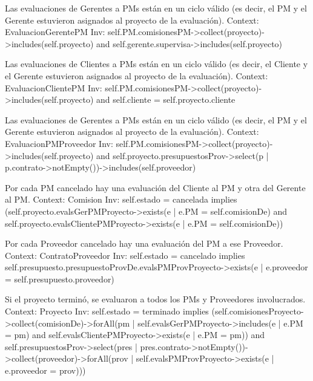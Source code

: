 \begin{listocl}

\begin{itemocl}{Las evaluaciones de Gerentes a PMs están en un ciclo válido (es decir, el PM y el Gerente estuvieron asignados al proyecto de la evaluación).}
Context: EvaluacionGerentePM
Inv: self.PM.comisionesPM->collect(proyecto)->includes(self.proyecto) and self.gerente.supervisa->includes(self.proyecto)
\end{itemocl}

\begin{itemocl}{Las evaluaciones de Clientes a PMs están en un ciclo válido (es decir, el Cliente y el Gerente estuvieron asignados al proyecto de la evaluación).}
Context: EvaluacionClientePM
Inv: self.PM.comisionesPM->collect(proyecto)->includes(self.proyecto) and self.cliente = self.proyecto.cliente
\end{itemocl}

\begin{itemocl}{Las evaluaciones de Gerentes a PMs están en un ciclo válido (es decir, el PM y el Gerente estuvieron asignados al proyecto de la evaluación).}
Context: EvaluacionPMProveedor
Inv: self.PM.comisionesPM->collect(proyecto)->includes(self.proyecto) and self.proyecto.presupuestosProv->select(p | p.contrato->notEmpty())->includes(self.proveedor)
\end{itemocl}

\begin{itemocl}{Por cada PM cancelado hay una evaluación del Cliente al PM y otra del Gerente al PM.}
Context: Comision
Inv: self.estado = cancelada implies (self.proyecto.evalsGerPMProyecto->exists(e | e.PM = self.comisionDe) and self.proyecto.evalsClientePMProyecto->exists(e | e.PM = self.comisionDe))
\end{itemocl}

\begin{itemocl}{Por cada Proveedor cancelado hay una evaluación del PM a ese Proveedor.}
Context: ContratoProveedor
Inv: self.estado = cancelado implies self.presupuesto.presupuestoProvDe.evalsPMProvProyecto->exists(e | e.proveedor = self.presupuesto.proveedor)
\end{itemocl}

\begin{itemocl}{Si el proyecto terminó, se evaluaron a todos los PMs y Proveedores involucrados.}
Context: Proyecto
Inv: self.estado = terminado implies (self.comisionesProyecto->collect(comisionDe)->forAll(pm | self.evalsGerPMProyecto->includes(e | e.PM = pm) and self.evalsClientePMProyecto->exists(e | e.PM = pm)) and self.presupuestosProv->select(pres | pres.contrato->notEmpty())->collect(proveedor)->forAll(prov | self.evalsPMProvProyecto->exists(e | e.proveedor = prov)))
\end{itemocl}


\end{listocl}
